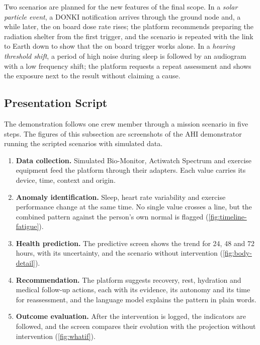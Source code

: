 Two scenarios are planned for the new features of the final scope. In a \textit{solar particle event}, a DONKI notification arrives through the ground node and, a while later, the on board dose rate rises; the platform recommends preparing the radiation shelter from the first trigger, and the scenario is repeated with the link to Earth down to show that the on board trigger works alone. In a \textit{hearing threshold shift}, a period of high noise during sleep is followed by an audiogram with a low frequency shift; the platform requests a repeat assessment and shows the exposure next to the result without claiming a cause.

\subsection{Presentation Script}
\label{subsec:presentation-script}

The demonstration follows one crew member through a mission scenario in five steps. The figures of this subsection are screenshots of the AHI demonstrator running the scripted scenarios with simulated data.

\begin{enumerate}
\item \textbf{Data collection.} Simulated Bio-Monitor, Actiwatch Spectrum and exercise equipment feed the platform through their adapters. Each value carries its device, time, context and origin.
\item \textbf{Anomaly identification.} Sleep, heart rate variability and exercise performance change at the same time. No single value crosses a line, but the combined pattern against the person's own normal is flagged (\ref{fig:timeline-fatigue}).
\item \textbf{Health prediction.} The predictive screen shows the trend for 24, 48 and 72 hours, with its uncertainty, and the scenario without intervention (\ref{fig:body-detail}).
\item \textbf{Recommendation.} The platform suggests recovery, rest, hydration and medical follow-up actions, each with its evidence, its autonomy and its time for reassessment, and the language model explains the pattern in plain words.
\item \textbf{Outcome evaluation.} After the intervention is logged, the indicators are followed, and the screen compares their evolution with the projection without intervention (\ref{fig:whatif}).
\end{enumerate}

